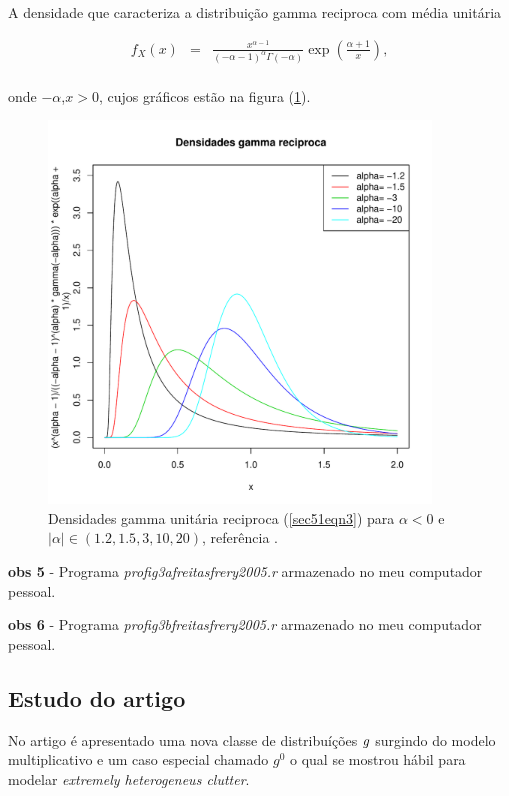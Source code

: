 \documentclass[10pt,a4paper]{article}
\begin{document}
A densidade que caracteriza a distribuição gamma reciproca com média unitária

\begin{equation}\label{sec51eqn3}
\begin{array}{ccc}
	f_{X}(x)&=&\frac{x^{\alpha-1}}{(-\alpha-1)^{\alpha}\Gamma(-\alpha)}\exp\left(\frac{\alpha+1}{x}\right), \\
\end{array}
\end{equation}

onde $-\alpha$,$x>0$, cujos gráficos estão na figura (\ref{sec51fig5}).

\begin{figure}[!htb]
\centering
\includegraphics[width=4.0in]{fig3b_freitas_frery_2005.pdf}
	\caption{Densidades gamma unitária reciproca (\ref{sec51eqn3}) para $\alpha < 0$ e $|\alpha|\in(1.2,1.5,3,10,20)$, referência \cite{freitas_frery_2005} .}
\label{sec51fig5}
\end{figure}

{\bf obs 5} - Programa {\it profig3afreitasfrery2005.r} armazenado no meu computador pessoal.

{\bf obs 6} - Programa {\it profig3bfreitasfrery2005.r} armazenado no meu computador pessoal.

\subsection{Estudo do artigo  \cite{frery_muller_1997}}

No artigo é apresentado uma nova classe de distribuíções ${\it g}$ surgindo do modelo multiplicativo e um caso especial chamado {\it $g^{0}$} o qual se mostrou hábil para modelar  {\it extremely heterogeneus clutter}.
\end{document}
